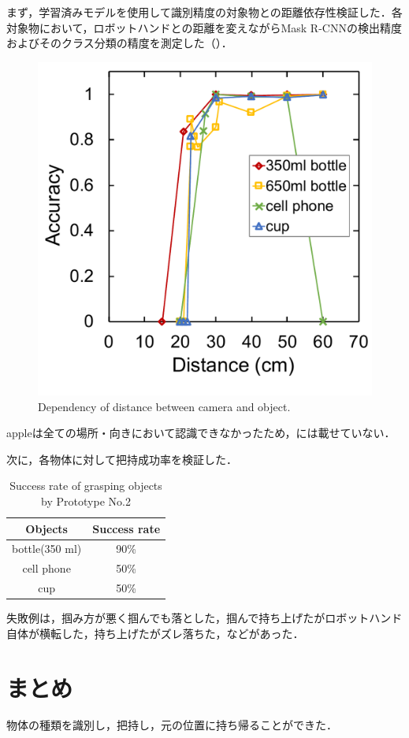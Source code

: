 まず，学習済みモデルを使用して識別精度の対象物との距離依存性検証した．各対象物において，ロボットハンドとの距離を変えながらMask R-CNNの検出精度およびそのクラス分類の精度を測定した（）．
\begin{figure}[H]
    \centering
    \includegraphics[width=0.6\linewidth]{figure/chapter4/mrcnn_depth}
    \caption{Dependency of distance between camera and object.}
    \label{fig:mrcnn距離}
\end{figure}
appleは全ての場所・向きにおいて認識できなかったため，には載せていない．



次に，各物体に対して把持成功率を検証した．

\begin{table}[H]
    \centering
    \caption{Success rate of grasping objects by Prototype No.2}
    \begin{tabular}{cc}\toprule
        Objects & Success rate \\ \midrule
        bottle(350 ml) & 90\% \\ 
        cell phone & 50\% \\ 
        cup & 50\% \\ \bottomrule
    \end{tabular} 
    \label{tab:把持成功率}
\end{table}

失敗例は，掴み方が悪く掴んでも落とした，掴んで持ち上げたがロボットハンド自体が横転した，持ち上げたがズレ落ちた，などがあった．

\section{まとめ}
物体の種類を識別し，把持し，元の位置に持ち帰ることができた．



